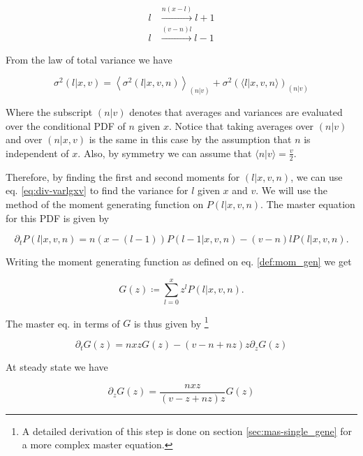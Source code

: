 \begin{equation}
  \label{eq:div-arr_disg}
  \begin{split}
    l&\xrightarrow{n(x-l)}l+1\\
    l&\xrightarrow{(v-n)l}l-1
  \end{split}
\end{equation}

From the law of total variance we have

\begin{equation}
  \label{eq:div-varlgxv}
  \sigma^2(l|x,v) = \left\langle\sigma^2(l|x,v,n)\right\rangle_{(n|v)}+\sigma^2\left(\langle l|x,v,n\rangle\right)_{(n|v)}
\end{equation}

Where the subscript $(n|v)$ denotes that averages and variances are evaluated over the conditional PDF of $n$ given $x$. Notice that taking averages over $(n|v)$ and over $(n|x,v)$ is the same in this case by the assumption that $n$ is independent of $x$. Also, by symmetry we can assume that $\langle n|v\rangle = \frac{v}{2}$.

Therefore, by finding the first and second moments for $(l|x,v,n)$, we can use eq. \eqref{eq:div-varlgxv} to find the variance for $l$ given $x$ and $v$. We will use the method of the moment generating function on $P(l|x,v,n)$. The master equation for this PDF is given by

\begin{equation}
  \partial_tP(l|x,v,n) = n(x-(l-1))P(l-1|x,v,n) - (v-n)lP(l|x,v,n).
\end{equation}

Writing the moment generating function as defined on eq. \eqref{def:mom_gen} we get

\begin{equation}
  \label{eq:div-Gdef}
  G(z) \coloneqq \sum_{l=0}^xz^lP(l|x,v,n).
\end{equation}

The master eq. in terms of $G$ is thus given by \footnote{A detailed derivation of this step is done on section \ref{sec:mas-single_gene} for a more complex master equation.}

\begin{equation*}
  \partial_tG(z) = nxzG(z) - (v-n+nz)z\partial_zG(z)
\end{equation*}

At steady state we have

\begin{equation}
  \partial_zG(z) = \frac{nxz}{(v-z+nz)z}G(z)
\end{equation}

